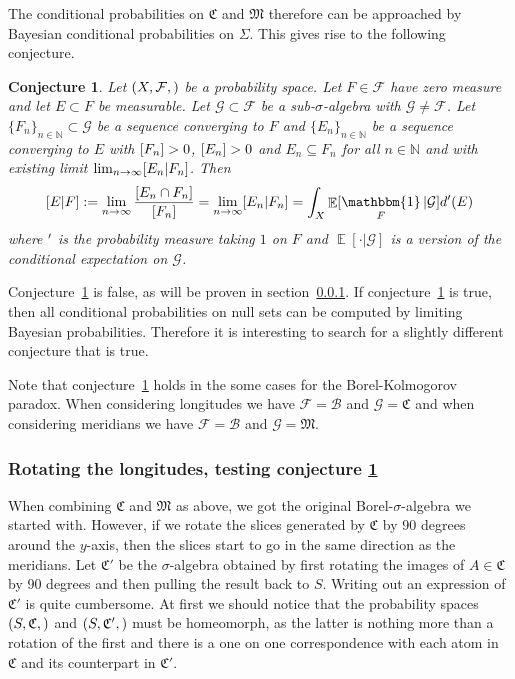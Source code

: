 \documentclass[twoside,a4paper]{article}
\theoremstyle{plain}
\newtheorem{conjecture}[theorem]{Conjecture}
\theoremstyle{definition}
\theoremstyle{remark}
\numberwithin{equation}{section}
\newcommand{\N}{\mathbb{N}}
\let\P\relax
\DeclareMathOperator{\P}{\mathbb{P}}
\DeclareMathOperator{\E}{\mathbb{E}}
\DeclareMathOperator{\1}{\mathbbm{1}}
\newcommand{\F}{\mathcal{F}}
\renewcommand{\G}{\mathcal{G}}
\newcommand{\B}{\mathcal{B}}
\begin{document}
The conditional probabilities on $\mathfrak{C}$ and $\mathfrak{M}$ therefore can be approached by Bayesian conditional probabilities on $\Sigma$. This gives rise to the following conjecture.
\begin{conjecture}\label{con:conditional}
Let $(X,\F,\P)$ be a probability space. Let $F\in\mathcal{F}$ have zero measure and let $E\subset F$ be measurable. Let $\G\subset\F$ be a sub-$\sigma$-algebra with $\G\neq\F$. Let $\{F_n\}_{n\in\N}\subset\G$ be a sequence converging to $F$ and $\{E_n\}_{n\in\N}$ be a sequence converging to $E$ with $\P[F_n]>0$, $\P[E_n]>0$ and $E_n\subseteq F_n$ for all $n\in\N$ and with existing limit $\lim_{n\to\infty}\P[E_n|F_n]$. Then
\[\P[E|F]:=\lim_{n\to\infty}\frac{\P[E_n\cap F_n]}{\P[F_n]}=\lim_{n\to\infty}\P[E_n|F_n]=\int_X\E[\1_F|\mathcal{G}]d\P'(E)\] where $\P'$ is the probability measure taking $1$ on $F$ and $\E[\cdot|\G]$ is a version of the conditional expectation on $\G$.
\end{conjecture}

Conjecture~\ref{con:conditional} is false, as will be proven in section~\ref{sec:borelkol-rotate-test}. If conjecture~\ref{con:conditional} is true, then all conditional probabilities on null sets can be computed by limiting Bayesian probabilities. Therefore it is interesting to search for a slightly different conjecture that is true.

Note that conjecture~\ref{con:conditional} holds in the some cases for the Borel-Kolmogorov paradox. When considering longitudes we have $\F=\B$ and $\G=\mathfrak{C}$ and when considering meridians we have $\F=\B$ and $\G=\mathfrak{M}$.

\subsubsection{Rotating the longitudes, testing conjecture \ref{con:conditional}}\label{sec:borelkol-rotate-test}
When combining $\mathfrak{C}$ and $\mathfrak{M}$ as above, we got the original Borel-$\sigma$-algebra we started with. However, if we rotate the slices generated by $\mathfrak{C}$ by 90 degrees around the $y$-axis, then the slices start to go in the same direction as the meridians. Let $\mathfrak{C}'$ be the $\sigma$-algebra obtained by first rotating the images of $A\in\mathfrak{C}$ by 90 degrees and then pulling the result back to $S$. Writing out an expression of $\mathfrak{C}'$ is quite cumbersome. At first we should notice that the probability spaces $(S,\mathfrak{C},\P)$ and $(S,\mathfrak{C}',\P)$ must be homeomorph, as the latter is nothing more than a rotation of the first and there is a one on one correspondence with each atom in $\mathfrak{C}$ and its counterpart in $\mathfrak{C}'$.
\end{document}
